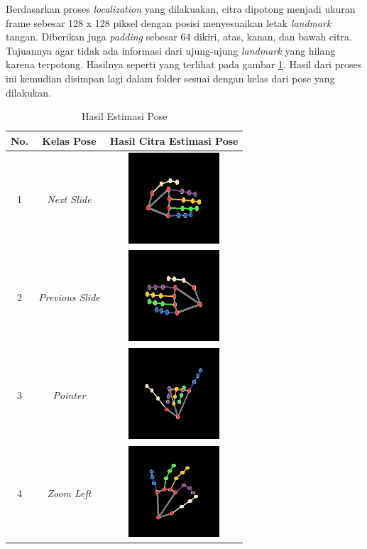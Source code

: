 Berdasarkan proses \emph{localization} yang dilakuakan, citra dipotong menjadi ukuran frame sebesar 128 x 128 piksel dengan posisi menyesuaikan letak \emph{landmark} tangan. Diberikan juga \emph{padding} sebesar 64 dikiri, atas, kanan, dan bawah citra. Tujuannya agar tidak ada informasi dari ujung-ujung \emph{landmark} yang hilang karena terpotong. Hasilnya seperti yang terlihat pada gambar \ref{tb:Hasil Estimasi Pose}. Hasil dari proses ini kemudian disimpan lagi dalam folder sesuai dengan kelas dari pose yang dilakukan.

\begin{longtable}{|c|c|c|}
  \caption{Hasil Estimasi Pose}
  \label{tb:Hasil Estimasi Pose}\\
  \hline
  \textbf{No.} & \textbf{Kelas Pose} & \textbf{Hasil Citra Estimasi Pose} \\
  \hline
  \endhead
  1 & \emph{Next Slide}  &  \includegraphics[scale=0.85]{gambar/pose_prediction_next_slide.jpg} \\
  \hline
  2 & \emph{Previous Slide}  &  \includegraphics[scale=0.85]{gambar/pose_prediction_previous_slide.jpg} \\
  \hline
  3 & \emph{Pointer}  &  \includegraphics[scale=0.85]{gambar/pose_prediction_pointer.jpg} \\
  \hline
  4 & \emph{Zoom Left}  &  \includegraphics[scale=0.85]{gambar/pose_prediction_zoom_left.jpg} \\

\end{longtable}
